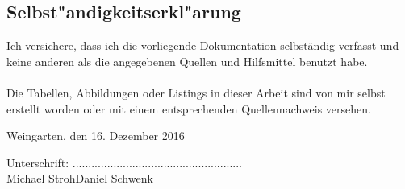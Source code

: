 \section*{Selbst"andigkeitserkl"arung}
\thispagestyle{empty}


Ich versichere, dass ich die vorliegende Dokumentation selbständig verfasst und keine anderen als die angegebenen Quellen und Hilfsmittel benutzt habe.\\
\setlength{\parindent}{0pt}\\
Die Tabellen, Abbildungen oder Listings in dieser Arbeit sind von mir selbst erstellt worden oder mit einem entsprechenden Quellennachweis versehen.

\vspace{0.5cm}\noindent\hspace{1.5cm}

Weingarten, den 16. Dezember 2016

\vspace{1cm}\noindent\hspace{1.5cm}

Unterschrift: \noindent\hspace*{10mm}...........................\hspace*{10mm}...........................\\
\noindent\hspace*{34.5mm}Michael Stroh\hspace*{16.2mm}Daniel Schwenk


\newpage
\thispagestyle{empty}
\chapter*{ }
\thispagestyle{empty}